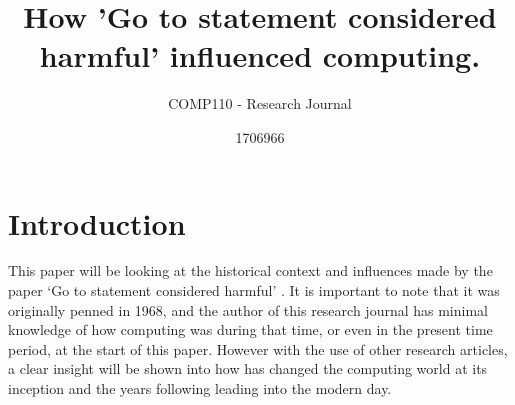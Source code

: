 \documentclass{scrartcl}
\title{How 'Go to statement considered harmful' influenced computing.}
\subtitle{COMP110 - Research Journal}
\author{1706966}
\begin{document}
\maketitle

\section{Introduction}

This paper will be looking at the historical context and influences made by the paper `Go to statement considered harmful' \cite{dijkstra2002go}. It is important to note that it was originally penned in 1968, and the author of this research journal has minimal knowledge of how computing was during that time, or even in the present time period, at the start of this paper. However with the use of other research articles, a clear insight will be shown into how \cite{dijkstra2002go} has changed the computing world at its inception and the years following leading into the modern day. 
\end{document}

